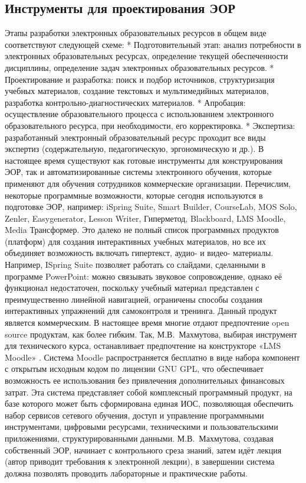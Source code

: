 \large
\subsection{Инструменты для проектирования ЭОР}
Этапы разработки электронных образовательных ресурсов в общем виде соответствуют следующей схеме:
* Подготовительный этап: анализ потребности в электронных образовательных ресурсах, определение текущей обеспеченности дисциплины, определение задач электронных образовательных ресурсов.
* Проектирование и разработка: поиск и подбор источников, структуризация учебных материалов, создание текстовых и мультимедийных материалов, разработка контрольно-диагностических материалов.
* Апробация: осуществление образовательного процесса с использованием электронного образовательного ресурса, при необходимости, его корректировка.
* Экспертиза: разработанный электронный образовательный ресурс проходит все виды экспертиз (содержательную, педагогическую, эргономическую и др.).
В настоящее время существуют как готовые инструменты для конструирования ЭОР, так и автоматизированные системы электронного обучения, которые применяют для обучения сотрудников коммерческие организации.
Перечислим, некоторые программные возможности, которые сегодня используются в подготовке ЭОР, например: iSpring Suite, Smart Builder, CourseLab, MOS Solo, Zenler, Easygenerator, Lesson Writer, Гиперметод, Blackboard, LMS Moodle, Media Трансформер.
Это далеко не полный список программных продуктов (платформ) для создания интерактивных учебных материалов, но все их объединяет возможность включать гипертекст, аудио- и видео- материалы. Например, ISpring Suite позволяет работать со слайдами, сделанными в программе PowerPoint: можно связывать звуковое сопровождение, однако её функционал недостаточен, поскольку учебный материал представлен с преимущественно линейной навигацией, ограничены способы создания интерактивных упражнений для самоконтроля и тренинга. Данный продукт является коммерческим. В настоящее время многие отдают предпочтение open source продуктам, как более гибким. Так, М.В.~Махмутова, выбирая инструмент для технического курса, останавливает предпочтение на конструкторе «LMS Moodle» \cite{mahmutova19}. 
Система Moodle распространяется бесплатно в виде набора компонент с открытым исходным кодом по лицензии GNU GPL, что обеспечивает возможность ее использования без привлечения дополнительных финансовых затрат. Эта система представляет собой комплексный программный продукт, на базе которого может быть сформирована единая ИОС, позволяющая обеспечить набор сервисов сетевого обучения, доступ и управление программными инструментами, цифровыми ресурсами, техническими и пользовательскими приложениями, структурированными данными. М.В.~Махмутова, создавая собственный ЭОР, начинает с контрольного среза знаний, затем идёт лекция (автор приводит требования к электронной лекции), в завершении система должна позволять проводить лабораторные и практические работы.
